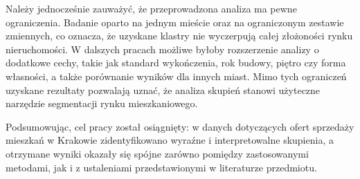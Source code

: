 \documentclass{report}
\begin{document}
Należy jednocześnie zauważyć, że przeprowadzona analiza ma pewne ograniczenia. Badanie oparto na jednym mieście oraz na ograniczonym zestawie zmiennych, co oznacza, że uzyskane klastry nie wyczerpują całej złożoności rynku nieruchomości. W dalszych pracach możliwe byłoby rozszerzenie analizy o dodatkowe cechy, takie jak standard wykończenia, rok budowy, piętro czy forma własności, a także porównanie wyników dla innych miast. Mimo tych ograniczeń uzyskane rezultaty pozwalają uznać, że analiza skupień stanowi użyteczne narzędzie segmentacji rynku mieszkaniowego.

Podsumowując, cel pracy został osiągnięty: w danych dotyczących ofert sprzedaży mieszkań w Krakowie zidentyfikowano wyraźne i interpretowalne skupienia, a otrzymane wyniki okazały się spójne zarówno pomiędzy zastosowanymi metodami, jak i z ustaleniami przedstawionymi w literaturze przedmiotu.
\end{document}
